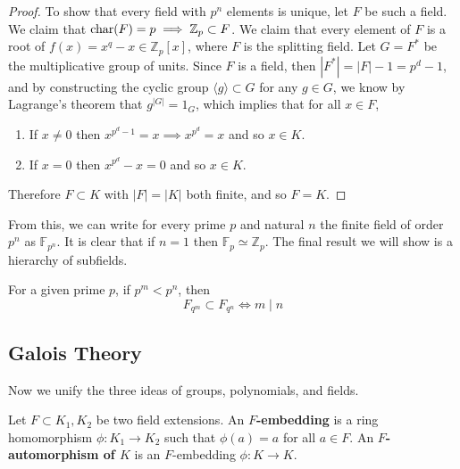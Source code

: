 \begin{proof}
    To show that every field with $p^n$ elements is unique, let $F$ be such a field. We claim that $\operatorname{char}(F) = p \implies \mathbb{Z}_p \subset F$. We claim that every element of $F$ is a root of $f(x) = x^q - x \in \mathbb{Z}_p [x]$, where $F$ is the splitting field. Let $G = F^\ast$ be the multiplicative group of units. Since $F$ is a field, then $|F^\ast| = |F| - 1 = p^d - 1$, and by constructing the cyclic group $\langle g \rangle \subset G$ for any $g \in G$, we know by Lagrange's theorem that $g^{|G|} = 1_G$, which implies that for all $x \in F$, 
    \begin{enumerate}
      \item If $x \neq 0$ then $x^{p^d - 1} = x \implies x^{p^d} = x$ and so $x \in K$. 
      \item If $x = 0$ then $x^{p^d} - x = 0$ and so $x \in K$. 
    \end{enumerate}
    Therefore $F \subset K$ with $|F| = |K|$ both finite, and so $F = K$. 
  \end{proof} 

  From this, we can write for every prime $p$ and natural $n$ the finite field of order $p^n$ as $\mathbb{F}_{p^n}$. It is clear that if $n = 1$ then $\mathbb{F}_p \simeq \mathbb{Z}_p$. The final result we will show is a hierarchy of subfields. 

  \begin{theorem}
    For a given prime $p$, if $p^m < p^n$, then 
    \begin{equation}
      F_{q^m} \subset F_{q^n} \iff m \mid n
    \end{equation}
  \end{theorem}

\subsection{Galois Theory} 

  \begin{definition}
    
  \end{definition}
  
  Now we unify the three ideas of groups, polynomials, and fields. 

  \begin{definition}
    Let $F \subset K_1, K_2$ be two field extensions. An \textbf{$F$-embedding} is a ring homomorphism $\phi: K_1 \to K_2$ such that $\phi(a) = a$ for all $a \in F$. An \textbf{$F$-automorphism of $K$} is an $F$-embedding $\phi: K \to K$. 
  \end{definition}

